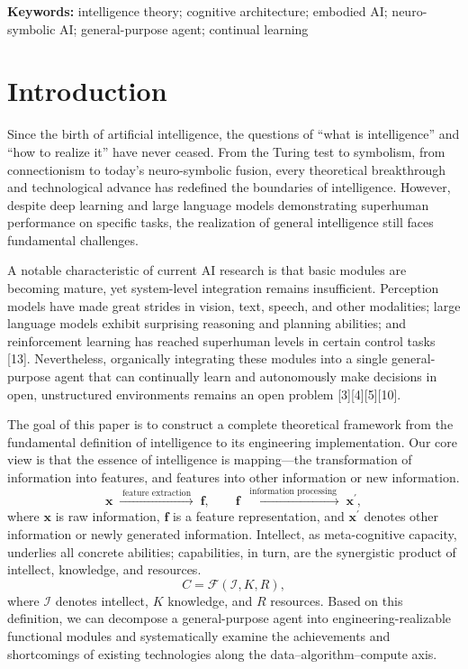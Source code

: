 \documentclass[12pt,a4paper]{article}
\newcommand{\Intell}{\mathcal{I}}
\begin{document}
\textbf{Keywords:} intelligence theory; cognitive architecture; embodied AI; neuro-symbolic AI; general-purpose agent; continual learning

\section{Introduction}
Since the birth of artificial intelligence, the questions of ``what is intelligence'' and ``how to realize it'' have never ceased. From the Turing test to symbolism, from connectionism to today's neuro-symbolic fusion, every theoretical breakthrough and technological advance has redefined the boundaries of intelligence. However, despite deep learning and large language models demonstrating superhuman performance on specific tasks, the realization of general intelligence still faces fundamental challenges.

A notable characteristic of current AI research is that basic modules are becoming mature, yet system-level integration remains insufficient. Perception models have made great strides in vision, text, speech, and other modalities; large language models exhibit surprising reasoning and planning abilities; and reinforcement learning has reached superhuman levels in certain control tasks [13]. Nevertheless, organically integrating these modules into a single general-purpose agent that can continually learn and autonomously make decisions in open, unstructured environments remains an open problem [3][4][5][10].

The goal of this paper is to construct a complete theoretical framework from the fundamental definition of intelligence to its engineering implementation. Our core view is that the essence of intelligence is mapping---the transformation of information into features, and features into other information or new information.
\begin{equation}
\mathbf{x}\;\xrightarrow{\;\text{feature extraction}\;}\;\mathbf{f},\qquad
\mathbf{f}\;\xrightarrow{\;\text{information processing}\;}\;\mathbf{x}^{\prime},
\label{eq:intro-mapping}
\end{equation}
where $\mathbf{x}$ is raw information, $\mathbf{f}$ is a feature representation, and $\mathbf{x}^{\prime}$ denotes other information or newly generated information. Intellect, as meta-cognitive capacity, underlies all concrete abilities; capabilities, in turn, are the synergistic product of intellect, knowledge, and resources.
\begin{equation}
C=\mathcal{F}\left(\Intell,K,R\right),
\label{eq:intro-capability}
\end{equation}
where $\Intell$ denotes intellect, $K$ knowledge, and $R$ resources. Based on this definition, we can decompose a general-purpose agent into engineering-realizable functional modules and systematically examine the achievements and shortcomings of existing technologies along the data--algorithm--compute axis.
\end{document}
